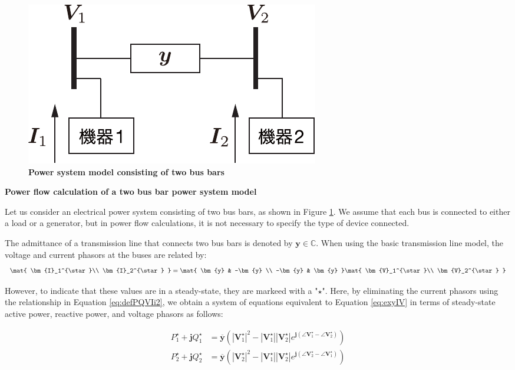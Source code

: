 \documentclass[graybox, envcountchap]{svmult}
\begin{document}
\begin{figure}[t]
\centering
\includegraphics[width = .4\linewidth]{figs/2busex}
\medskip
\caption{\textbf{Power system model consisting of two bus bars}}
\label{fig:2buspf}
\medskip
\end{figure}

\begin{example}{\textbf{\textbf{Power flow calculation of a two bus bar power system
model}}}\label{ex:2buspf}

Let us consider an electrical power system consisting of two bus bars, as shown
in Figure \ref{fig:2buspf}.  We assume that each bus is connected to either a
load or a generator, but in power flow calculations, it is not necessary to
specify the type of device connected.

The admittance of a transmission line that connects two bus bars is denoted by
$\bm{y}\in \mathbb{C}$. When using the basic transmission line model, the
voltage and current phasors at the buses are related by:
\begin{equation}\label{eq:exyIV}
  \mat{
    \bm{I}_1^{\star}\\
    \bm{I}_2^{\star}
  }
  =
  \mat{
    \bm{y} & -\bm{y} \\
    -\bm{y} & \bm{y}
  }
  \mat{
    \bm{V}_1^{\star}\\
    \bm{V}_2^{\star}
  }
\end{equation}

However, to indicate that these values are in a steady-state, they are markeed
with a "${\star}$". Here, by eliminating the current phasors using the
relationship in Equation \ref{eq:defPQVIi2}, we obtain a system of equations
equivalent to Equation \ref{eq:exyIV} in terms of steady-state active power,
reactive power, and voltage phasors as follows:

\begin{subequations}\label{eq:PQpf}
\begin{equation}\label{eq:PQcom}
  \begin{aligned}
    P_1^{\star} + \bm{j} Q_1^{\star} &= 
    \overline{\bm{y}} \left( 
    |\bm{V}_1^{\star}|^2 
    -  |\bm{V}_1^{\star}| |\bm{V}_2^{\star}| e^{ \bm{j} (\angle \bm{V}_1^{\star}- \angle \bm{V}_2^{\star})}
    \right) \\
    P_2^{\star} + \bm{j} Q_2^{\star} &= 
    \overline{\bm{y}} \left( 
    |\bm{V}_2^{\star}|^2
    - |\bm{V}_1^{\star}| |\bm{V}_2^{\star}| e^{ \bm{j} (\angle \bm{V}_2^{\star} - \angle \bm{V}_1^{\star})}
    \right)
  \end{aligned}
\end{equation}


\end{subequations}
\end{example}
\end{document}

